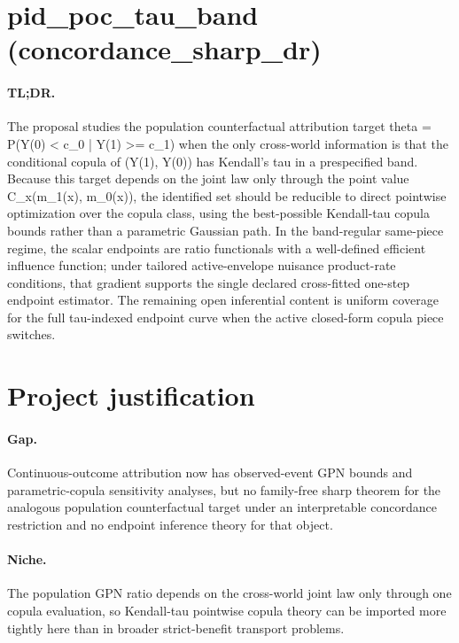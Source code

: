 \documentclass{article}
\begin{document}
\section*{pid_poc_tau_band (concordance_sharp_dr)}

\paragraph{TL;DR.} The proposal studies the population counterfactual attribution target theta = P(Y(0) < c_0 | Y(1) >= c_1) when the only cross-world information is that the conditional copula of (Y(1), Y(0)) has Kendall's tau in a prespecified band. Because this target depends on the joint law only through the point value C_x(m_1(x), m_0(x)), the identified set should be reducible to direct pointwise optimization over the copula class, using the best-possible Kendall-tau copula bounds rather than a parametric Gaussian path. In the band-regular same-piece regime, the scalar endpoints are ratio functionals with a well-defined efficient influence function; under tailored active-envelope nuisance product-rate conditions, that gradient supports the single declared cross-fitted one-step endpoint estimator. The remaining open inferential content is uniform coverage for the full tau-indexed endpoint curve when the active closed-form copula piece switches.

\section{Project justification}

\paragraph{Gap.} Continuous-outcome attribution now has observed-event GPN bounds and parametric-copula sensitivity analyses, but no family-free sharp theorem for the analogous population counterfactual target under an interpretable concordance restriction and no endpoint inference theory for that object.

\paragraph{Niche.} The population GPN ratio depends on the cross-world joint law only through one copula evaluation, so Kendall-tau pointwise copula theory can be imported more tightly here than in broader strict-benefit transport problems.
\end{document}
